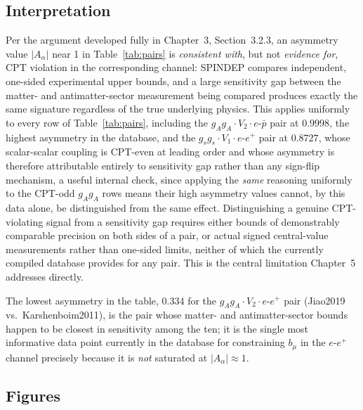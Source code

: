 \documentclass[main]{subfiles}
\begin{document}
\subsection{Interpretation}

Per the argument developed fully in Chapter~3, Section~3.2.3, an
asymmetry value $|A_\alpha|$ near 1 in Table~\ref{tab:pairs} is
\emph{consistent with}, but not \emph{evidence for}, CPT violation in the
corresponding channel: SPINDEP compares independent, one-sided experimental
upper bounds, and a large sensitivity gap between the matter- and
antimatter-sector measurement being compared produces exactly the same
signature regardless of the true underlying physics. This applies uniformly
to every row of Table~\ref{tab:pairs}, including the $g_Ag_A\cdot V_2\cdot e$-$\bar p$
pair at $0.9998$, the highest asymmetry in the database, and the
$g_sg_s\cdot V_1\cdot e$-$e^+$ pair at $0.8727$, whose scalar-scalar
coupling is CPT-even at leading order and whose asymmetry is therefore
attributable entirely to sensitivity gap rather than any sign-flip
mechanism, a useful internal check, since applying the \emph{same}
reasoning uniformly to the CPT-odd $g_Ag_A$ rows means their high asymmetry
values cannot, by this data alone, be distinguished from the same
effect. Distinguishing a genuine CPT-violating signal from a sensitivity
gap requires either bounds of demonstrably comparable precision on both
sides of a pair, or actual signed central-value measurements rather than
one-sided limits, neither of which the currently compiled database
provides for any pair. This is the central limitation Chapter~5 addresses
directly.

The lowest asymmetry in the table, $0.334$ for the $g_Ag_A\cdot V_2\cdot e$-$e^+$
pair (Jiao2019 vs.\ Karshenboim2011), is the pair whose matter- and
antimatter-sector bounds happen to be closest in sensitivity among the ten;
it is the single most informative data point currently in the database for
constraining $b_\mu$ in the $e$-$e^+$ channel precisely because it is
\emph{not} saturated at $|A_\alpha|\approx1$.

\subsection{Figures}
\end{document}
